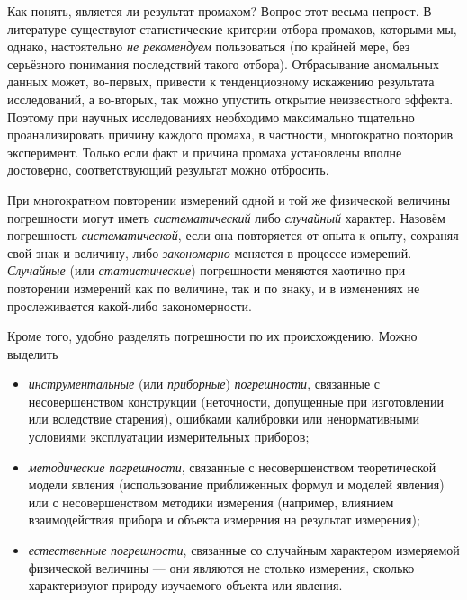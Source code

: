 
Как понять, является ли  результат промахом? Вопрос этот весьма
непрост. В литературе существуют статистические
критерии отбора промахов, которыми мы, однако, настоятельно \emph{не рекомендуем}
пользоваться (по крайней мере, без серьёзного понимания последствий
такого отбора). Отбрасывание аномальных данных может, во-первых, привести
к тенденциозному искажению результата исследований, а во-вторых, так
можно упустить открытие неизвестного эффекта. Поэтому при научных
исследованиях необходимо максимально тщательно проанализировать причину
каждого промаха, в частности, многократно повторив эксперимент. Только если факт и причина промаха установлены вполне достоверно,
соответствующий результат можно отбросить.


При многократном повторении измерений одной и той же физической величины
погрешности могут иметь \emph{систематический} либо \emph{случайный}
характер. Назовём погрешность \emph{систематической}, если она повторяется
от опыта к опыту, сохраняя свой знак и величину, либо \emph{закономерно}
меняется в процессе измерений. \emph{Случайные} (или \emph{статистические})
погрешности меняются хаотично при повторении измерений как по величине,
так и по знаку, и в изменениях не прослеживается какой-либо закономерности.

Кроме того, удобно разделять погрешности по их происхождению. Можно
выделить
\begin{itemize}\small
    \item \emph{инструментальные} (или \emph{приборные}) \emph{погрешности},
связанные с несовершенством конструкции (неточности, допущенные при
изготовлении или вследствие старения), ошибками калибровки или ненормативными
условиями эксплуатации измерительных приборов;
    \item \emph{методические} \emph{погрешности}, связанные с несовершенством
теоретической модели явления (использование приближенных формул и
моделей явления) или с несовершенством методики измерения (например,
влиянием взаимодействия прибора и объекта измерения на результат измерения);
    \item \emph{естественные} \emph{погрешности}, связанные со случайным
характером
измеряемой физической величины --- они являются не столько
 измерения, сколько характеризуют
природу изучаемого объекта или явления.
\end{itemize}

